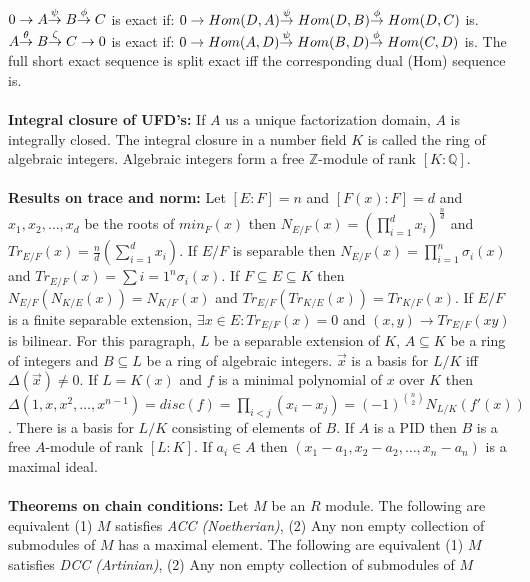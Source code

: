 $0 \rightarrow A
{\buildrel\rm \psi\over \rightarrow} \; B {\buildrel\rm \phi\over \rightarrow} \; 
C$ is exact if:
$0 \rightarrow Hom(D, A)
{\buildrel\rm \psi\over \rightarrow} \; Hom(D, B) {\buildrel\rm \phi\over \rightarrow} \; 
Hom(D, C)$ is.
$A
{\buildrel\rm \theta\over \rightarrow} \; B {\buildrel\rm \zeta\over \rightarrow} \; 
C \rightarrow 0$ 
is exact if:
$0 \rightarrow Hom(A, D)
{\buildrel\rm \psi\over \rightarrow} \; Hom(B, D) {\buildrel\rm \phi\over \rightarrow} \; 
Hom(C, D)$ is.  The full short exact sequence is split exact iff the corresponding
dual (Hom) sequence is.
\\
\\
{\bf Integral closure of  UFD's:} 
If $A$ us a unique factorization domain, $A$ is integrally closed.  
The integral closure in a number field
$K$ is called the ring of algebraic integers.  Algebraic integers form a free
${\mathbb Z}$-module of rank $[K:{\mathbb Q}]$.
\\
\\
{\bf Results on trace and norm:}
Let $[E:F]=n$ and $[F(x):F]=d$ and $x_1 , x_2 , \ldots , x_d$ be the
roots of $min_F(x)$ then 
$N_{E/F}(x)= (\prod_{i=1}^d x_i)^{\frac n d}$ and
$Tr_{E/F}(x)= {\frac n d} (\sum_{i=1}^d x_i)$.  
If $E/F$ is separable then
$N_{E/F}(x)= \prod_{i=1}^n \sigma_i(x)$ and
$Tr_{E/F}(x)= \sum{i=1}^n \sigma_i(x)$.  If $F \subseteq E \subseteq K$ then
$N_{E/F}(N_{K/E}(x))= N_{K/F}(x)$ and $Tr_{E/F}(Tr_{K/E}(x))= Tr_{K/F}(x)$.  If
$E/F$ is a finite separable extension, $\exists x \in E: Tr_{E/F}(x)= 0$ and
$(x,y) \rightarrow Tr_{E/F}(xy)$ is bilinear.
For this paragraph, $L$ be a separable extension of $K$, 
$A \subseteq K$ be a ring of integers and
$B \subseteq L$ be a ring of algebraic integers.
${\vec x}$ is a basis for $L/K$ iff $\Delta({\vec x}) \ne 0$.  If
$L=K(x)$ and $f$ is a minimal polynomial of $x$ over $K$ then
$\Delta(1,x,x^2, \ldots, x^{n-1})= disc(f)= \prod_{i<j} (x_i-x_j)=
(-1)^{n \choose 2} N_{L/K}(f'(x))$.  There is a basis for $L/K$ consisting
of elements of $B$.  If $A$ is a PID then $B$ is a free $A$-module of rank $[L:K]$.
If $a_i \in A$ then $(x_1-a_1 , x_2 - a_2 , \ldots , x_n-a_n)$ is a maximal ideal.
\\
\\
{\bf Theorems on chain conditions:}
Let $M$ be an $R$ module.  
The following are equivalent
(1) $M$ satisfies \emph{ACC (Noetherian)}, 
(2) Any non empty collection of submodules of $M$
has a maximal element.
The following are equivalent
(1) $M$ satisfies \emph{DCC (Artinian)}, (2) Any non empty collection of submodules of $M$
